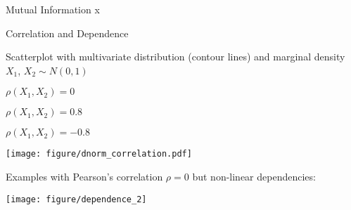 \documentclass[11pt,compress,t,notes=noshow, aspectratio=169, xcolor=table]{beamer}
\begin{document}
\begin{frame}{Mutual Information}
    x
\end{frame}



\begin{frame}{Correlation and Dependence}

Scatterplot with multivariate distribution (contour lines) and marginal density $X_1$, $X_2 \sim N(0,1)$ 

\begin{center}
\begin{minipage}[t]{0.3\textwidth}
\centering
 $\rho(X_1, X_2) = 0$
\end{minipage}
\begin{minipage}[t]{0.3\textwidth}
\centering
 $\rho(X_1, X_2) = 0.8$
\end{minipage}
\begin{minipage}[t]{0.3\textwidth}
\centering
 $\rho(X_1, X_2) = -0.8$
\end{minipage}
\texttt{[image: figure/dnorm\_correlation.pdf]}
\end{center}

\pause

Examples with Pearson's correlation $\rho = 0$ but non-linear dependencies:

\centering
\texttt{[image: figure/dependence\_2]}
\end{frame}
\end{document}
